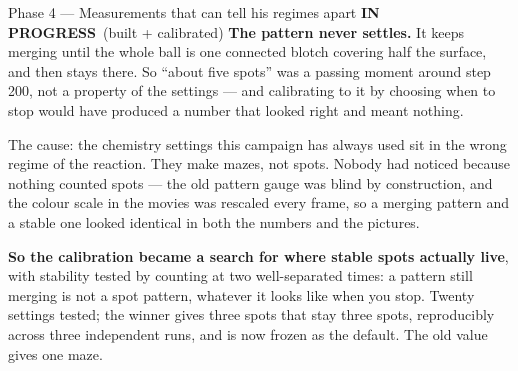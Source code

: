 \documentclass[11pt,a4paper]{article}
\newcommand{\prog}{\textcolor{warn}{\textbf{IN PROGRESS}}}
\begin{document}
\begin{phasebox}{Phase 4 --- Measurements that can tell his regimes apart \hfill \prog\ (built + calibrated)}
\textbf{The pattern never settles.} It keeps merging until the whole ball is one connected blotch
covering half the surface, and then stays there. So ``about five spots'' was a passing moment around
step 200, not a property of the settings --- and calibrating to it by choosing when to stop would
have produced a number that looked right and meant nothing.

The cause: the chemistry settings this campaign has always used sit in the wrong regime of the
reaction. They make mazes, not spots. Nobody had noticed because nothing counted spots --- the old
pattern gauge was blind by construction, and the colour scale in the movies was rescaled every
frame, so a merging pattern and a stable one looked identical in both the numbers and the pictures.

\textbf{So the calibration became a search for where stable spots actually live}, with stability
tested by counting at two well-separated times: a pattern still merging is not a spot pattern,
whatever it looks like when you stop. Twenty settings tested; the winner gives three spots that stay
three spots, reproducibly across three independent runs, and is now frozen as the default. The old
value gives one maze.
\end{phasebox}
\end{document}
